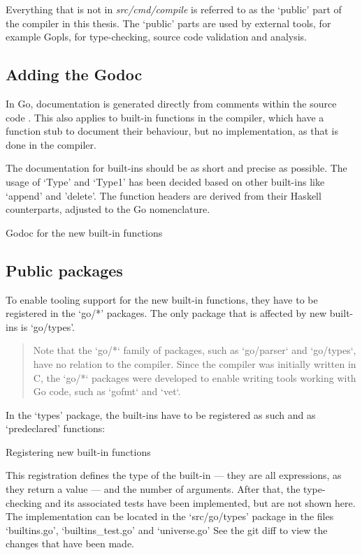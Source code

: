 Everything that is not in \textit{src/cmd/compile} is referred to as the `public'
part of the compiler in this thesis. The `public' parts are used by external
tools, for example Gopls, for type-checking, source code validation and
analysis.

\subsection{Adding the Godoc}
In Go, documentation is generated directly from comments within the source code
\autocite{godoc}. This also applies to built-in functions in the compiler, which
have a function stub to document their behaviour\autocite{godoc-builtin}, but
no implementation, as that is done in the compiler\autocite{builtin-impl}.

The documentation for built-ins should be as short and precise as possible.
The usage of `Type' and `Type1' has been decided based on other built-ins
like `append' and 'delete'.
The function headers are derived from their Haskell counterparts, adjusted
to the Go nomenclature.

\begin{code}
	\caption{Godoc for the new built-in functions\autocite{new-builtins-godoc}}
\end{code}
\subsection{Public packages}

To enable tooling support for the new built-in functions, they have to be
registered in the `go/*' packages. The only package that is affected by new
built-ins is `go/types'.

\begin{quote}
Note that the `go/*` family of packages, such as `go/parser` and `go/types`,
have no relation to the compiler. Since the compiler was initially written in C,
the `go/*` packages were developed to enable writing tools working with Go code,
such as `gofmt` and `vet`.\autocite{compiler-readme}
\end{quote}

In the `types' package, the built-ins have to be registered as such and as
`predeclared' functions:

\begin{code}
	\caption{Registering new built-in functions\autocite{new-builtins-universe}}
\end{code}
This registration defines the type of the built-in --- they are all expressions,
as they return a value --- and the number of arguments.
After that, the type-checking and its associated tests have been implemented, but
are not shown here. The implementation can be located in the `src/go/types' package
in the files `builtins.go', `builtins\_test.go' and `universe.go' See the git
diff\autocite{ba-go1-14-thesis-diff} to view the changes that have been made.

